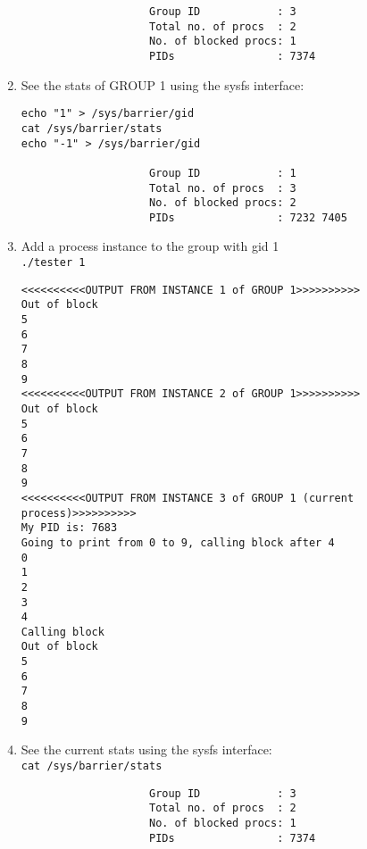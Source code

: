 \documentclass[10px]{article}
\begin{document}
\begin{enumerate}
\begin{verbatim}
                    Group ID            : 3
                    Total no. of procs  : 2
                    No. of blocked procs: 1
                    PIDs                : 7374 
\end{verbatim}
\item See the stats of GROUP 1 using the sysfs interface:
\begin{verbatim}
echo "1" > /sys/barrier/gid
cat /sys/barrier/stats
echo "-1" > /sys/barrier/gid

                    Group ID            : 1
                    Total no. of procs  : 3
                    No. of blocked procs: 2
                    PIDs                : 7232 7405 
\end{verbatim}
\item Add a process instance to the group with gid 1\\
\texttt{./tester 1}
\begin{verbatim}
<<<<<<<<<<OUTPUT FROM INSTANCE 1 of GROUP 1>>>>>>>>>>
Out of block
5
6
7
8
9
<<<<<<<<<<OUTPUT FROM INSTANCE 2 of GROUP 1>>>>>>>>>>
Out of block
5
6
7
8
9
<<<<<<<<<<OUTPUT FROM INSTANCE 3 of GROUP 1 (current process)>>>>>>>>>>
My PID is: 7683
Going to print from 0 to 9, calling block after 4
0
1
2
3
4
Calling block
Out of block
5
6
7
8
9
\end{verbatim}
\item See the current stats using the sysfs interface:\\
\texttt{cat /sys/barrier/stats}
\begin{verbatim}
                    Group ID            : 3
                    Total no. of procs  : 2
                    No. of blocked procs: 1
                    PIDs                : 7374
\end{verbatim}
\end{enumerate}
\end{document}
